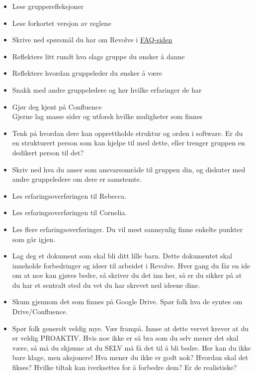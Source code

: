 \begin{itemize}
	\item Lese grupperefleksjoner
	\item Lese forkortet versjon av reglene
	\item Skrive ned spørsmål du har om Revolve i \href{http://revolvevault.ivt.ntnu.no:8090/display/GEN/Frequently+asked+questions+about+Revolve}{FAQ-siden}
	\item Reflektere litt rundt hva slags gruppe du ønsker å danne
	\item Reflektere hvordan gruppeleder du ønsker å være
	\item Snakk med andre gruppeledere og hør hvilke erfaringer de har
	\item Gjør deg kjent på Confluence\\ \tab
	Gjerne lag masse sider og utforsk hvilke muligheter som finnes
	\item Tenk på hvordan dere kan opprettholde struktur og orden i software. Er du en strukturert person som kan hjelpe til med dette, eller trenger gruppen en dedikert person til det?
	\item Skriv ned hva du anser som ansvarsområde til gruppen din, og diskuter med andre gruppeledere om dere er samstemte.
	\item Les erfaringsoverføringen til Rebecca.
	\item Les erfaringsoverføringen til Cornelia.
	\item Les flere erfaringsoverføringer. Du vil mest sannsynlig finne enkelte punkter som går igjen.
	\item Lag deg et dokument som skal bli ditt lille barn. Dette dokumentet skal inneholde forbedringer og ideer til arbeidet i Revolve. Hver gang du får en ide om at noe kan gjøres bedre, så skriver du det inn her, så er du sikker på at du har et sentralt sted du vet du har skrevet ned ideene dine. 
	\item Skum gjennom det som finnes på Google Drive. Spør folk hva de syntes om Drive/Confluence.
	\item Spør folk generelt veldig mye. Vær frampå. Innse at dette vervet krever at du er veldig PROAKTIV. Hvis noe ikke er så bra som du selv mener det skal være, så må du skjønne at du SELV må få det til å bli bedre. Her kan du ikke bare klage, men aksjonere! Hva mener du ikke er godt nok? Hvordan skal det fikses? Hvilke tiltak kan iverksettes for å forbedre dem? Er de realistiske?
\end{itemize}

